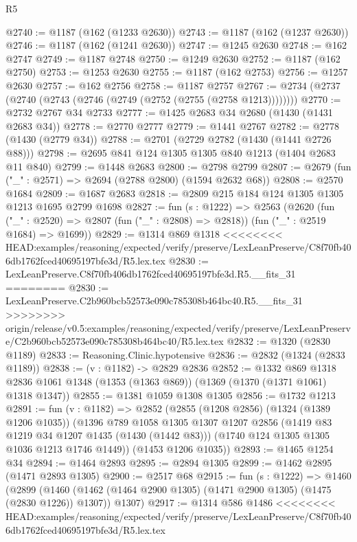 \begin{lexlean}{R5}
\begin{coremodule}
{{{{{{{{{{{{{{{{{{{{{{{{{{{{{{{{{{{{{{{{{{{{{{{{{{{{{{{{{{{{{{{{{{{{{{{{{{{{{{{{{{{{@2740 := @1187 (@162 (@1233 @2630))
@2743 := @1187 (@162 (@1237 @2630))
@2746 := @1187 (@162 (@1241 @2630))
@2747 := @1245 @2630
@2748 := @162 @2747
@2749 := @1187 @2748
@2750 := @1249 @2630
@2752 := @1187 (@162 @2750)
@2753 := @1253 @2630
@2755 := @1187 (@162 @2753)
@2756 := @1257 @2630
@2757 := @162 @2756
@2758 := @1187 @2757
@2767 := @2734 (@2737 (@2740 (@2743 (@2746 (@2749 (@2752 (@2755 (@2758 @1213))))))))
@2770 := @2732 @2767 @34 @2733
@2777 := @1425 @2683 @34 @2680 (@1430 (@1431 @2683 @34))
@2778 := @2770 @2777
@2779 := @1441 @2767
@2782 := @2778 (@1430 (@2779 @34))
@2788 := @2701 (@2729 @2782 (@1430 (@1441 @2726 @88)))
@2798 := @2695 @841 @124 @1305 @1305 @840 @1213 (@1404 @2683 @11 @840)
@2799 := @1448 @2683
@2800 := @2798 @2799
@2807 := @2679 (fun ("_" : @2571) => @2694 (@2788 @2800) (@1594 @2632 @68))
@2808 := @2570 @1684
@2809 := @1687 @2683
@2818 := @2809 @215 @184 @124 @1305 @1305 @1213 @1695 @2799 @1698
@2827 := fun (s : @1222) =>
  @2563
    (@2620
      (fun ("_" : @2520) => @2807 (fun ("_" : @2808) => @2818))
      (fun ("_" : @2519 @1684) => @1699))
@2829 := @1314 @869 @1318
<<<<<<<< HEAD:examples/reasoning/expected/verify/preserve/LexLeanPreserve/C8f70fb406db1762fced40695197bfe3d/R5.lex.tex
@2830 := LexLeanPreserve.C8f70fb406db1762fced40695197bfe3d.R5.__fits_31
========
@2830 := LexLeanPreserve.C2b960bcb52573e090c785308b464bc40.R5.__fits_31
>>>>>>>> origin/release/v0.5:examples/reasoning/expected/verify/preserve/LexLeanPreserve/C2b960bcb52573e090c785308b464bc40/R5.lex.tex
@2832 := @1320 (@2830 @1189)
@2833 := Reasoning.Clinic.hypotensive
@2836 := @2832 (@1324 (@2833 @1189))
@2838 := (v : @1182) -> @2829 @2836
@2852 := @1332
    @869
    @1318
    @2836
    @1061
    @1348
    (@1353 (@1363 @869))
    (@1369 (@1370 (@1371 @1061) @1318 @1347))
@2855 := @1381 @1059 @1308 @1305
@2856 := @1732 @1213
@2891 := fun (v : @1182) =>
  @2852
    (@2855
      (@1208 @2856)
      (@1324 (@1389 @1206 @1035))
      (@1396
        @789
        @1058
        @1305
        @1307
        @1207
        @2856
        (@1419 @83 @1219 @34 @1207 @1435 (@1430 (@1442 @83)))
        (@1740 @124 @1305 @1305 @1036 @1213 @1746 @1449))
      (@1453 @1206 @1035))
@2893 := @1465 @1254 @34
@2894 := @1464 @2893
@2895 := @2894 @1305
@2899 := @1462 @2895 (@1471 @2893 @1305)
@2900 := @2517 @68
@2915 := fun (s : @1222) =>
  @1460
    (@2899
      (@1460 (@1462 (@1464 @2900 @1305) (@1471 @2900 @1305) (@1475 (@2830 @1226)) @1307))
      @1307)
@2917 := @1314 @586 @1486
<<<<<<<< HEAD:examples/reasoning/expected/verify/preserve/LexLeanPreserve/C8f70fb406db1762fced40695197bfe3d/R5.lex.tex
}}}}}}}}}}}}}}}}}}}}}}}}}}}}}}}}}}}}}}}}}}}}}}}}}}}}}}}}}}}}}}}}}}}}}}}}}}}}}}}}}}}}
\end{coremodule}
\end{lexlean}
